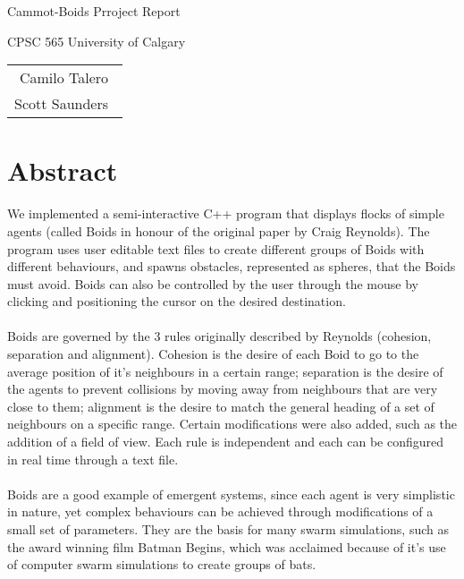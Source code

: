 \documentclass[12pt]{article}
\begin{document}
\thispagestyle{empty}
\begin{titlepage}
	\null\vfill
	
	\begin{center}
		
		{\Huge Cammot-Boids Prroject Report}
		\vskip 2cm
		
		{\large CPSC 565 University of Calgary}
	\end{center}
	
	\vfill
	\vfill
	
	\begin{tabular}{r}
		Camilo Talero\ \\
		Scott Saunders\    
	\end{tabular}
	\hfill
\end{titlepage}

	
\newpage
\clearpage
\setcounter{page}{1}

\section*{Abstract}

\indent We implemented a semi-interactive C++ program that displays flocks of simple agents (called Boids in honour of the original paper by Craig Reynolds). The program uses user editable text files to create different groups of Boids with different behaviours, and spawns obstacles, represented as spheres, that the Boids must avoid. Boids can also be controlled by the user through the mouse by clicking and positioning the cursor on the desired destination. 
\\ \\
Boids are governed by the 3 rules originally described by Reynolds (cohesion, separation and alignment). Cohesion is the desire of each Boid to go to the average position of it's neighbours in a certain range; separation is the desire of the agents to prevent collisions by moving away from neighbours that are very close to them; alignment is the desire to match the general heading of a set of neighbours on a specific range. Certain modifications were also added, such as the addition of a field of view. Each rule is independent and each can be configured in real time through a text file. 
\\ \\
Boids are a good example of emergent systems, since each agent is very simplistic in nature, yet complex behaviours can be achieved through modifications of a small set of parameters. They are the basis for many swarm simulations, such as the award winning film Batman Begins, which was acclaimed because of it's use of computer swarm simulations to create groups of bats.
\end{document}
